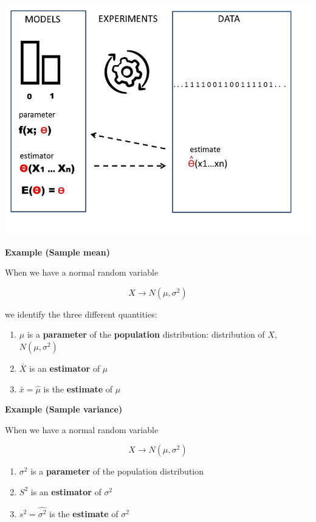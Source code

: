 \documentclass[
]{book}
\providecommand{\tightlist}{%
  \setlength{\itemsep}{0pt}\setlength{\parskip}{0pt}}
\begin{document}
\includegraphics{./figures/estimator.JPG}

\textbf{Example (Sample mean)}

When we have a normal random variable

\[X \rightarrow N(\mu, \sigma^2)\]

we identify the three different quantities:

\begin{enumerate}
\def\labelenumi{\arabic{enumi}.}
\tightlist
\item
  \(\mu\) is a \textbf{parameter} of the \textbf{population} distribution: distribution of \(X\), \(N(\mu, \sigma^2)\)
\item
  \(\bar{X}\) is an \textbf{estimator} of \(\mu\)
\item
  \(\bar{x}=\hat{\mu}\) is the \textbf{estimate} of \(\mu\)
\end{enumerate}

\textbf{Example (Sample variance)}

When we have a normal random variable

\[X \rightarrow N(\mu, \sigma^2)\]

\begin{enumerate}
\def\labelenumi{\arabic{enumi}.}
\tightlist
\item
  \(\sigma^2\) is a \textbf{parameter} of the population distribution
\item
  \(S^2\) is an \textbf{estimator} of \(\sigma^2\)
\item
  \(s^2=\hat{\sigma^2}\) is the \textbf{estimate} of \(\sigma^2\)
\end{enumerate}
\end{document}
